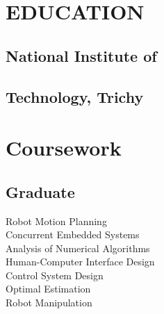 \documentclass[]{deedy-resume-openfont}
\begin{document}
%
%
\lastupdated
%
%
\smaller
{}

%
%

\begin{minipage}[t]{0.33\textwidth} 


\section{EDUCATION}
\subsection{National Institute of} \subsection{Technology, Trichy }

\sectionsep


\section{Coursework}

\subsection{Graduate}
Robot Motion Planning\\
Concurrent Embedded Systems\\
Analysis of Numerical Algorithms\\
Human-Computer Interface Design\\
Control System Design\\
Optimal Estimation\\
Robot Manipulation\\


\end{minipage}
\end{document}
